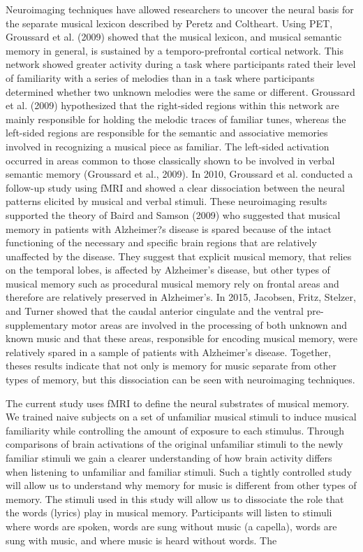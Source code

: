 \documentclass[12pt,letterpaper]{report}
\begin{document}
Neuroimaging techniques have allowed researchers to uncover the neural basis for the separate musical lexicon described by Peretz and Coltheart. Using PET, Groussard et al. (2009) showed that the musical lexicon, and musical semantic memory in general, is sustained by a temporo-prefrontal cortical network. This network showed greater activity during a task where participants rated their level of familiarity with a series of melodies than in a task where participants determined whether two unknown melodies were the same or different. Groussard et al. (2009) hypothesized that the right-sided regions within this network are mainly responsible for holding the melodic traces of familiar tunes, whereas the left-sided regions are responsible for the semantic and associative memories involved in recognizing a musical piece as familiar. The left-sided activation occurred in areas common to those classically shown to be involved in verbal semantic memory (Groussard et al., 2009). In 2010, Groussard et al. conducted a follow-up study using fMRI and showed a clear dissociation between the neural patterns elicited by musical and verbal stimuli. These neuroimaging results supported the theory of Baird and Samson (2009) who suggested that musical memory in patients with Alzheimer?s disease is spared because of the intact functioning of the necessary and specific brain regions that are relatively unaffected by the disease. They suggest that explicit musical memory, that relies on the temporal lobes, is affected by Alzheimer's disease, but other types of musical memory such as procedural musical memory rely on frontal areas and therefore are relatively preserved in Alzheimer's. In 2015, Jacobsen, Fritz, Stelzer, and Turner showed that the caudal anterior cingulate and the ventral pre-supplementary motor areas are involved in the processing of both unknown and known music and that these areas, responsible for encoding musical memory, were relatively spared in a sample of patients with Alzheimer's disease. Together, theses results indicate that not only is memory for music separate from other types of memory, but this dissociation can be seen with neuroimaging techniques. 

The current study uses fMRI to define the neural substrates of musical memory. We trained naive subjects on a set of unfamiliar musical stimuli to induce musical familiarity while controlling the amount of exposure to each stimulus. 
Through comparisons of brain activations of the original unfamiliar stimuli to the newly familiar stimuli we gain a clearer understanding of how brain activity differs when listening to unfamiliar and familiar stimuli. 
Such a tightly controlled study will allow us to understand why memory for music is different from other types of memory. 
The stimuli used in this study will allow us to dissociate the role that the words (lyrics) play in musical memory. Participants will listen to stimuli where words are spoken, words are sung without music (a capella), words are sung with music, and where music is heard without words. 
The 
\end{document}
